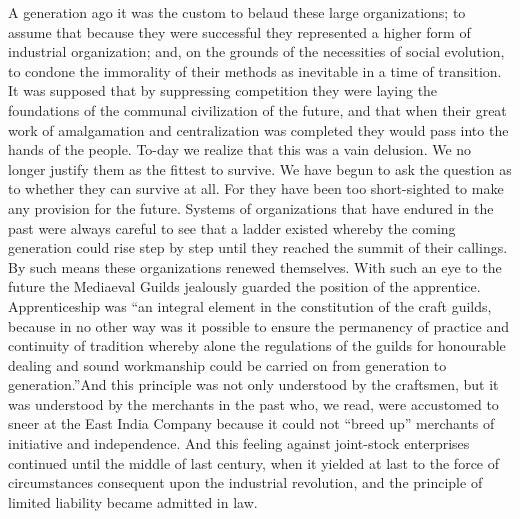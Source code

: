 \documentclass{book}
\begin{document}
A generation ago it was the custom to belaud these large organizations; to assume that because they were successful they represented a higher form of industrial organization; and, on the grounds of the necessities of social evolution, to condone the immorality of their methods as inevitable in a time of transition. It was supposed that by suppressing competition they were laying the foundations of the communal civilization of the future, and that when their great work of amalgamation and centralization was completed they would pass into the hands of the people. To-day we realize that this was a vain delusion. We no longer justify them as the fittest to survive. We have begun to ask the question as to whether they can survive at all. For they have been too short-sighted to make any provision for the future. Systems of organizations that have endured in the past were always careful to see that a ladder existed whereby the coming generation could rise step by step until they reached the summit of their callings. By such means these organizations renewed themselves. With such an eye to the future the Mediaeval Guilds jealously guarded the position of the apprentice. Apprenticeship was “an integral element in the constitution of the craft guilds, because in no other way was it possible to ensure the permanency of practice and continuity of tradition whereby alone the regulations of the guilds for honourable dealing and sound workmanship could be carried on from generation to generation.”\footnotemark[1] And this principle was not only understood by the craftsmen, but it was understood by the merchants in the past who, we read, were accustomed to sneer at the East India Company because it could not “breed up” merchants of initiative and independence. And this feeling against joint-stock enterprises continued until the middle of last century, when it yielded at last to the force of circumstances consequent upon the industrial revolution, and the principle of limited liability became admitted in law.\footnotemark[2]
\end{document}
